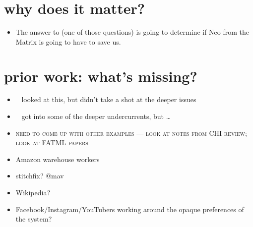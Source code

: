 \documentclass[10pt]{article}
\begin{document}
  \section{why does it matter?}
    \begin{itemize}
      \item The answer to (one of those questions) is going to determine if Neo from the Matrix is going to have to save us.
    \end{itemize}
  
  \section{prior work: what's missing?}
    \begin{itemize}
      \item \citeauthor{uberAlgorithm}~\cite{uberAlgorithm} looked at this, but didn't take a shot at the deeper issues
      \item \citeauthor{turkopticon}~\cite{turkopticon} got into some of the deeper undercurrents, but \dots
      \item \textsc{need to come up with other examples --- look at notes from CHI review; look at FATML papers}
      \item Amazon warehouse workers
      \item stitchfix? @mav
      \item Wikipedia?
      \item Facebook/Instagram/YouTubers working around the opaque preferences of the system?
    \end{itemize}
  
\end{document}
